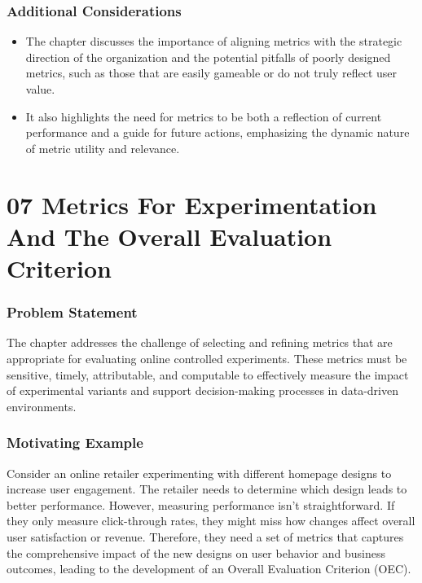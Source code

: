 \documentclass{article}
\begin{document}
\subsubsection*{Additional Considerations}
\begin{itemize}
    \item The chapter discusses the importance of aligning metrics with the strategic direction of the organization and the potential pitfalls of poorly designed metrics, such as those that are easily gameable or do not truly reflect user value.
    \item It also highlights the need for metrics to be both a reflection of current performance and a guide for future actions, emphasizing the dynamic nature of metric utility and relevance.
\end{itemize}

\section*{07 Metrics For Experimentation And The Overall Evaluation Criterion}
\subsubsection*{Problem Statement}
The chapter addresses the challenge of selecting and refining metrics that are appropriate for evaluating online controlled experiments. These metrics must be sensitive, timely, attributable, and computable to effectively measure the impact of experimental variants and support decision-making processes in data-driven environments.

\subsubsection*{Motivating Example}
Consider an online retailer experimenting with different homepage designs to increase user engagement. The retailer needs to determine which design leads to better performance. However, measuring performance isn't straightforward. If they only measure click-through rates, they might miss how changes affect overall user satisfaction or revenue. Therefore, they need a set of metrics that captures the comprehensive impact of the new designs on user behavior and business outcomes, leading to the development of an Overall Evaluation Criterion (OEC).
\end{document}
